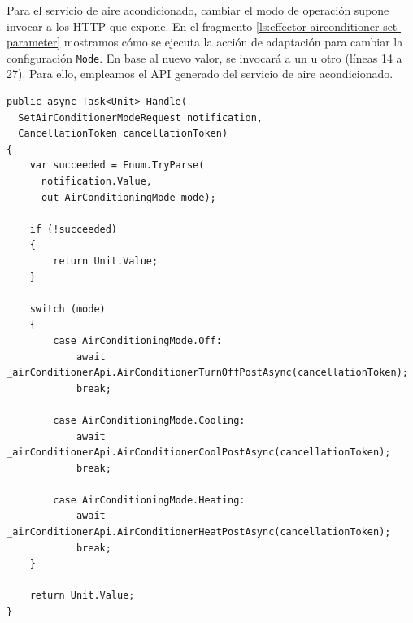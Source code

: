 Para el servicio de aire acondicionado, cambiar el modo de operación supone invocar a los  HTTP que expone. En el fragmento \ref{ls:effector-airconditioner-set-parameter} mostramos cómo se ejecuta la acción de adaptación para cambiar la configuración \texttt{Mode}. En base al nuevo valor, se invocará a un  u otro (líneas 14 a 27). Para ello, empleamos el API  generado del servicio de aire acondicionado.

\begin{lstlisting}[language={[Sharp]C},caption={Implementación de los efectores del aire acondicionado. Invocan a los endpoints HTTP en base a las acciones de adaptación.\protect\footnotemark},captionpos=b, label=ls:effector-airconditioner-set-parameter]
public async Task<Unit> Handle(
  SetAirConditionerModeRequest notification,
  CancellationToken cancellationToken)
{
    var succeeded = Enum.TryParse(
      notification.Value,
      out AirConditioningMode mode);

    if (!succeeded)
    {
        return Unit.Value;
    }

    switch (mode)
    {
        case AirConditioningMode.Off:
            await _airConditionerApi.AirConditionerTurnOffPostAsync(cancellationToken);
            break;

        case AirConditioningMode.Cooling:
            await _airConditionerApi.AirConditionerCoolPostAsync(cancellationToken);
            break;

        case AirConditioningMode.Heating:
            await _airConditionerApi.AirConditionerHeatPostAsync(cancellationToken);
            break;
    }

    return Unit.Value;
}
\end{lstlisting}


